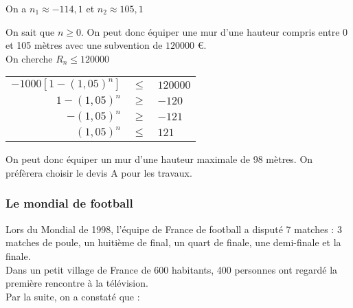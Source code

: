 \begin{itemize}
\vspace*{.3cm}

On a $n_1 \approx -114,1$ et $n_2 \approx 105,1$ \\


\vspace*{.3cm}

On sait que $n \geqslant 0$. On peut donc équiper une mur d'une hauteur compris entre 0 et 105 mètres avec une subvention de $120 000$ €. \\

On cherche $R_n \leqslant 120 000$ \\

\begin{tabular}{rll}
$ -1000\left[1-\left(1,05\right)^n\right]$ & $\leq$ &  $120 000$ \\
$1-\left(1,05\right)^n$ & $\geq$ & $-120$ \\
$-\left(1,05\right)^n$ & $\geq$ & $-121$ \\
$\left(1,05\right)^n$ & $\leq$ & $121$ \\
\end{tabular}

\vspace*{.3cm}

On peut donc équiper un mur d'une hauteur maximale de 98 mètres. On préfèrera choisir le devis A pour les travaux.

\end{itemize}

\newpage

\subsubsection{Le mondial de football}

Lors du Mondial de 1998, l'équipe de France de football a disputé 7 matches : 3 matches de poule, un huitième de final, un quart de finale, une demi-finale et la finale. \\ Dans un petit village de France de 600 habitants, 400 personnes ont regardé la première rencontre à la télévision. \\

Par la suite, on a constaté que : \\

